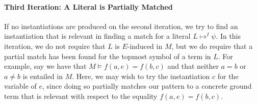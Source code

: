 \documentclass{llncs}
\newtheorem{thm}{Theorem}
\begin{document}
\begin{comment}
\begin{thm}
\label{thm:eind-ready}
Given a candidate-satisifiable DPLL(T) state $M \parallel F$, a formula $\psi$ of the form $\forall \bar{x}. \varphi[ \bar{x} ]$ that is counterexample-active in $M \parallel F$, and a set of equalities $\bar{e} = \bar{s}$ where $\bar{e} \mapsto^I \psi$, if each literal $L \in M$ where $L \mapsto^I \psi$ is $\bar{e} = \bar{s}$-induced in $M$, then $\varphi[\bar{s}]$ is $T$-unsatisifiable in $M$.
\end{thm}
\begin{proof}
By Theorem~\ref{thm:cerep}, we have that $M \models \neg \varphi[\bar{e}]$.
Say we have that $L_1[\bar{e}] \ldots L_n[\bar{e}] \models \neg \varphi[\bar{e}]$ where $L_1 \ldots L_n \subseteq M$. 
For each $L_i$ such that $L_i \mapsto^I \psi$, we have that $M \backslash L_i[\bar{e}], \bar{e} = \bar{s} \models_T L_i[\bar{e}]$ by assumption, and thus $M \models_T L_i[\bar{s}]$.
For each $L_j$ not containing instantiation constants from $\psi$, we have that $M \models L_j[\bar{s}]$.
Thus $M \models_T \neg \varphi[\bar{s}]$, or in other words, $\varphi[\bar{s}]$ is T-unsatisifiable in $M$. $\Box$
\end{proof}

Theorem~\ref{thm:eind-ready} states that if all instantiation literals for $\psi$ are induced by some equality set $E$, then the corresponding instantiation for $E$ is guarenteed to lead to a conflict.
In particular, it can be shown that each equality set $\bar{e} = \bar{s}$ produced by $generate\_inst\_2( M, \psi )$ is such that all literals of $\psi$ are $\bar{e} = \bar{s}$-induced in $M$.
Thus, if any instantiations are returned on this iteration, we are guarenteed to encounter a conflict.
In particular, this means we need only perform \emph{one} such instantiation.
\end{comment}

\paragraph{Third Iteration: A Literal is Partially Matched}

If no instantiations are produced on the second iteration, we try to find an instantiation that is relevant in finding a match for a literal $L \mapsto^I \psi$.
In this iteration, we do not require that $L$ is $E$-induced in $M$, but we do require that a partial match has been found for the topmost symbol of a term in $L$.
For example, say we have that $M \models f( a, e ) = f( b, c )$ and that neither $a = b$ or $a \neq b$ is entailed in $M$.  
Here, we may wish to try the instantiation $c$ for the variable of $e$, since doing so partially matches our pattern to a concrete ground term that is relevant with respect to the equality $f( a, e ) = f( b, c )$.
\end{document}
